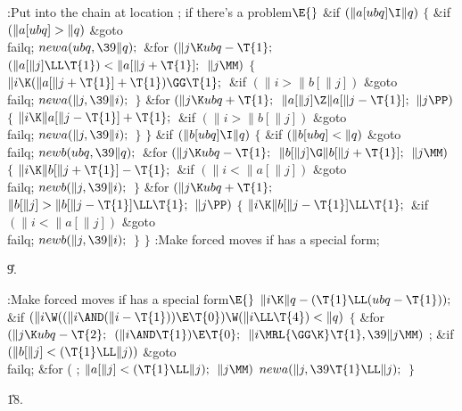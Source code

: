 \Y\B\4:Put  into the chain at location ;  if there's a problem\X${}\E{}$\6
\&{if} ${}(\|a[\\{ubq}]\I\|q){}$\5
${}\{{}$\1\6
\&{if} ${}(\|a[\\{ubq}]>\|q){}$\1\5
\&{goto} \\{failq};\2\6
${}\\{newa}(\\{ubq},\39\|q);{}$\6
\&{for} ${}(\|j\K\\{ubq}-\T{1};{}$ ${}(\|a[\|j]\LL\T{1})<\|a[\|j+\T{1}];{}$ ${}%
\|j\MM){}$\5
${}\{{}$\1\6
${}\|i\K(\|a[\|j+\T{1}]+\T{1})\GG\T{1};{}$\6
\&{if} ${}(\|i>\|b[\|j]){}$\1\5
\&{goto} \\{failq};\2\6
${}\\{newa}(\|j,\39\|i);{}$\6
\4${}\}{}$\2\6
\&{for} ${}(\|j\K\\{ubq}+\T{1};{}$ ${}\|a[\|j]\Z\|a[\|j-\T{1}];{}$ ${}\|j%
\PP){}$\5
${}\{{}$\1\6
${}\|i\K\|a[\|j-\T{1}]+\T{1};{}$\6
\&{if} ${}(\|i>\|b[\|j]){}$\1\5
\&{goto} \\{failq};\2\6
${}\\{newa}(\|j,\39\|i);{}$\6
\4${}\}{}$\2\6
\4${}\}{}$\2\6
\&{if} ${}(\|b[\\{ubq}]\I\|q){}$\5
${}\{{}$\1\6
\&{if} ${}(\|b[\\{ubq}]<\|q){}$\1\5
\&{goto} \\{failq};\2\6
${}\\{newb}(\\{ubq},\39\|q);{}$\6
\&{for} ${}(\|j\K\\{ubq}-\T{1};{}$ ${}\|b[\|j]\G\|b[\|j+\T{1}];{}$ ${}\|j%
\MM){}$\5
${}\{{}$\1\6
${}\|i\K\|b[\|j+\T{1}]-\T{1};{}$\6
\&{if} ${}(\|i<\|a[\|j]){}$\1\5
\&{goto} \\{failq};\2\6
${}\\{newb}(\|j,\39\|i);{}$\6
\4${}\}{}$\2\6
\&{for} ${}(\|j\K\\{ubq}+\T{1};{}$ ${}\|b[\|j]>\|b[\|j-\T{1}]\LL\T{1};{}$ ${}%
\|j\PP){}$\5
${}\{{}$\1\6
${}\|i\K\|b[\|j-\T{1}]\LL\T{1};{}$\6
\&{if} ${}(\|i<\|a[\|j]){}$\1\5
\&{goto} \\{failq};\2\6
${}\\{newb}(\|j,\39\|i);{}$\6
\4${}\}{}$\2\6
\4${}\}{}$\2\6
:Make forced moves if  has a special form\X;\par
\U9.\fi

\B{}:Make forced moves if  has a special form\X${}\E{}$\6
$\|i\K\|q-(\T{1}\LL(\\{ubq}-\T{1}));{}$\6
\&{if} ${}(\|i\W((\|i\AND(\|i-\T{1}))\E\T{0})\W(\|i\LL\T{4})<\|q){}$\5
${}\{{}$\1\6
\&{for} ${}(\|j\K\\{ubq}-\T{2};{}$ ${}(\|i\AND\T{1})\E\T{0};{}$ ${}\|i\MRL{{%
\GG}{\K}}\T{1},\39\|j\MM){}$\1\5
;\2\6
\&{if} ${}(\|b[\|j]<(\T{1}\LL\|j)){}$\1\5
\&{goto} \\{failq};\2\6
\&{for} ( ; ${}\|a[\|j]<(\T{1}\LL\|j);{}$ ${}\|j\MM){}$\1\5
${}\\{newa}(\|j,\39\T{1}\LL\|j);{}$\2\6
\4${}\}{}$\2\par
\U18.\fi

